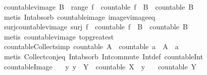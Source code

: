 \begin{isabellebody}
\endisatagproof
{\isafoldproof}%
%
\isadelimproof
\isanewline
%
\endisadelimproof
\isanewline
{}\isamarkupfalse%
\ countable{\isacharunderscore}vimage{\isacharcolon}\ {\isachardoublequoteopen}B\ {\isasymsubseteq}\ range\ f\ {\isasymLongrightarrow}\ countable\ {\isacharparenleft}f\ {\isacharminus}{\isacharbackquote}\ B{\isacharparenright}\ {\isasymLongrightarrow}\ countable\ B{\isachardoublequoteclose}\isanewline
%
\isadelimproof
\ \ %
\endisadelimproof
%
\isatagproof
{}\isamarkupfalse%
\ {\isacharparenleft}metis\ Int{\isacharunderscore}absorb{}\ countable{\isacharunderscore}image\ image{\isacharunderscore}vimage{\isacharunderscore}eq{\isacharparenright}%
\endisatagproof
{\isafoldproof}%
%
\isadelimproof
\isanewline
%
\endisadelimproof
\isanewline
{}\isamarkupfalse%
\ surj{\isacharunderscore}countable{\isacharunderscore}vimage{\isacharcolon}\ {\isachardoublequoteopen}surj\ f\ {\isasymLongrightarrow}\ countable\ {\isacharparenleft}f\ {\isacharminus}{\isacharbackquote}\ B{\isacharparenright}\ {\isasymLongrightarrow}\ countable\ B{\isachardoublequoteclose}\isanewline
%
\isadelimproof
\ \ %
\endisadelimproof
%
\isatagproof
{}\isamarkupfalse%
\ {\isacharparenleft}metis\ countable{\isacharunderscore}vimage\ top{\isacharunderscore}greatest{\isacharparenright}%
\endisatagproof
{\isafoldproof}%
%
\isadelimproof
\isanewline
%
\endisadelimproof
\isanewline
{}\isamarkupfalse%
\ countable{\isacharunderscore}Collect{\isacharbrackleft}simp{\isacharbrackright}{\isacharcolon}\ {\isachardoublequoteopen}countable\ A\ {\isasymLongrightarrow}\ countable\ {\isacharbraceleft}a\ {\isasymin}\ A{\isachardot}\ {\isasymphi}\ a{\isacharbraceright}{\isachardoublequoteclose}\isanewline
%
\isadelimproof
\ \ %
\endisadelimproof
%
\isatagproof
{}\isamarkupfalse%
\ {\isacharparenleft}metis\ Collect{\isacharunderscore}conj{\isacharunderscore}eq\ Int{\isacharunderscore}absorb\ Int{\isacharunderscore}commute\ Int{\isacharunderscore}def\ countable{\isacharunderscore}Int{}{\isacharparenright}%
\endisatagproof
{\isafoldproof}%
%
\isadelimproof
\isanewline
%
\endisadelimproof
\isanewline
{}\isamarkupfalse%
\ countable{\isacharunderscore}Image{\isacharcolon}\isanewline
\ \ \ {\isachardoublequoteopen}{\isasymAnd}y{\isachardot}\ y\ {\isasymin}\ Y\ {\isasymLongrightarrow}\ countable\ {\isacharparenleft}X\ {\isacharbackquote}{\isacharbackquote}\ {\isacharbraceleft}y{\isacharbraceright}{\isacharparenright}{\isachardoublequoteclose}\isanewline
\ \ \ {\isachardoublequoteopen}countable\ Y{\isachardoublequoteclose}\isanewline

\end{isabellebody}
